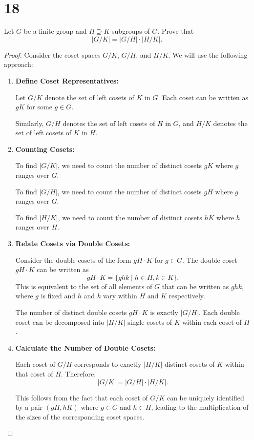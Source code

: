 \documentclass{article}
\begin{document}
\section*{18}
Let $G$ be a finite group and $H \supseteq K$ subgroups of $G$. Prove that 
\[
|G/K| = |G/H| \cdot |H/K|.
\]
\begin{proof}
    Consider the coset spaces \( G/K \), \( G/H \), and \( H/K \). We will use the following approach:

\begin{enumerate}
    \item \textbf{Define Coset Representatives:}

    Let \( G/K \) denote the set of left cosets of \( K \) in \( G \). Each coset can be written as \( gK \) for some \( g \in G \).

    Similarly, \( G/H \) denotes the set of left cosets of \( H \) in \( G \), and \( H/K \) denotes the set of left cosets of \( K \) in \( H \).

    \item \textbf{Counting Cosets:}

    To find \( |G/K| \), we need to count the number of distinct cosets \( gK \) where \( g \) ranges over \( G \).

    To find \( |G/H| \), we need to count the number of distinct cosets \( gH \) where \( g \) ranges over \( G \).

    To find \( |H/K| \), we need to count the number of distinct cosets \( hK \) where \( h \) ranges over \( H \).

    \item \textbf{Relate Cosets via Double Cosets:}

    Consider the double cosets of the form \( gH \cdot K \) for \( g \in G \). The double coset \( gH \cdot K \) can be written as
    \[
    gH \cdot K = \{ ghk \mid h \in H, k \in K \}.
    \]
    This is equivalent to the set of all elements of \( G \) that can be written as \( ghk \), where \( g \) is fixed and \( h \) and \( k \) vary within \( H \) and \( K \) respectively.

    The number of distinct double cosets \( gH \cdot K \) is exactly \( |G/H| \). Each double coset can be decomposed into \( |H/K| \) single cosets of \( K \) within each coset of \( H \).

    \item \textbf{Calculate the Number of Double Cosets:}

    Each coset of \( G/H \) corresponds to exactly \( |H/K| \) distinct cosets of \( K \) within that coset of \( H \). Therefore,
    \[
    |G/K| = |G/H| \cdot |H/K|.
    \]

    This follows from the fact that each coset of \( G/K \) can be uniquely identified by a pair \((gH, hK)\) where \( g \in G \) and \( h \in H \), leading to the multiplication of the sizes of the corresponding coset spaces.
\end{enumerate}
\end{proof}
\end{document}
